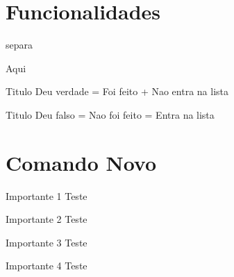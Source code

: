 \section{Funcionalidades}


\setcounter{CounterFuncionalidade}{0}
\begin{itemize}
	\renewcommand*{\do}[1]{\item #1}
\end{itemize}   



separa

\setcounter{CounterFuncionalidade}{0}
\begin{itemize}
\end{itemize}



\hypertarget{TA}{Aqui}

\begin{envteste}[1]{Titulo}
Deu verdade = Foi feito + Nao entra na lista
\end{envteste}
 


\begin{envteste}{Titulo}
Deu falso = Nao foi feito = Entra na lista
\end{envteste}



\section{Comando Novo}

\begin{importante}{Importante 1}
	Teste
\end{importante}


\begin{importante}{Importante 2}
	Teste
\end{importante}


\begin{importante}{Importante 3}
	Teste
\end{importante}


\begin{importante}{Importante 4}
	Teste
\end{importante}


